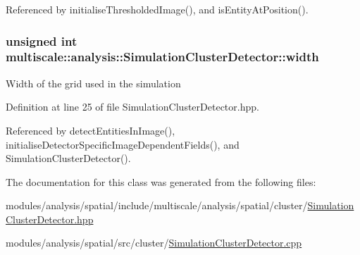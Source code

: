 Referenced by initialise\-Thresholded\-Image(), and is\-Entity\-At\-Position().

\hypertarget{classmultiscale_1_1analysis_1_1SimulationClusterDetector_a4c66a82aa1749dce31c767bc4008d904}{
\subsubsection[{width}]{\setlength{\rightskip}{0pt plus 5cm}unsigned int multiscale\-::analysis\-::\-Simulation\-Cluster\-Detector\-::width\hspace{0.3cm}{\ttfamily [private]}}}\label{classmultiscale_1_1analysis_1_1SimulationClusterDetector_a4c66a82aa1749dce31c767bc4008d904}
Width of the grid used in the simulation 

Definition at line 25 of file Simulation\-Cluster\-Detector.\-hpp.



Referenced by detect\-Entities\-In\-Image(), initialise\-Detector\-Specific\-Image\-Dependent\-Fields(), and Simulation\-Cluster\-Detector().



The documentation for this class was generated from the following files\-:\begin{DoxyCompactItemize}
\item 
modules/analysis/spatial/include/multiscale/analysis/spatial/cluster/\hyperlink{SimulationClusterDetector_8hpp}{Simulation\-Cluster\-Detector.\-hpp}\item 
modules/analysis/spatial/src/cluster/\hyperlink{SimulationClusterDetector_8cpp}{Simulation\-Cluster\-Detector.\-cpp}\end{DoxyCompactItemize}
